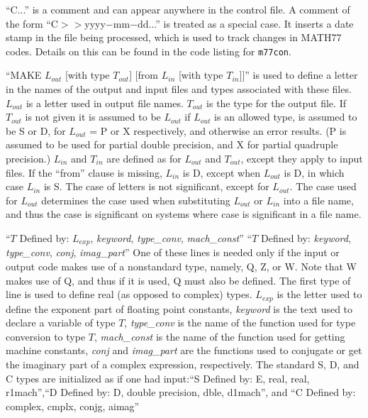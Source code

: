 \documentclass[twoside]{MATH77}
\begin{document}
``C...'' is a comment and can appear anywhere in the control file.  A
comment of the form ``C$>>$yyyy$-$mm$-$dd...'' is treated as a special
case.  It inserts a date stamp in the file being processed, which is
used to track changes in MATH77 codes. Details on this can be found in
the code listing for {\tt m77con}.

``MAKE $L_{out}$ [with type $T_{out}$] [from $L_{in}$ [with type
$T_{in}$]]'' is used to define a letter in the names of the output
and input files and types associated with these files.  $L_{out}$ is
a letter used in output file names.  $T_{out}$ is the type for the
output file. If $T_{out}$ is not given it is assumed to be $L_{out}$
if $L_{out}$ is an allowed type, is assumed to be S or D, for
$L_{out}$ =  P or X respectively, and otherwise an error results.  (P
is assumed to be used for partial double precision, and X for partial
quadruple precision.)  $L_{in}$ and $T_{in}$ are defined as for
$L_{out}$ and $T_{out}$, except they apply to input files.  If the
``from'' clause is missing, $L_{in}$ is D, except when $L_{out}$ is
D, in which case $L_{in}$ is S. The case of letters is not
significant, except for $L_{out}$.  The case used for $L_{out}$
determines the case used when substituting $L_{out}$ or $L_{in}$ into
a file name, and thus the case is significant on systems where case
is significant in a file name.

``$T$ Defined by: $L_{exp}$, {\em keyword}, {\em type\_conv}, {\em
mach\_const}\/''\newline
``$T$ Defined by: {\em keyword}, {\em type\_conv},
{\em conj}, {\em imag\_part}\/''\newline
One of these lines is needed only if the input or output code makes
use of a nonstandard type, namely, Q, Z, or W.  Note that W makes use
of Q, and thus if it is used, Q must also be defined.  The first type
of line is used to define real (as opposed to complex) types.  $L_{exp}$
is the letter used to define the exponent part of floating point
constants, {\em keyword} is the text used to declare a variable of
type $T$, {\em type\_conv} is the name of the function used for type
conversion to type $T$, {\em mach\_const} is the name of the function
used for getting machine constants, {\em conj} and {\em imag\_part}
are the functions used to conjugate or get the imaginary part of a
complex expression, respectively.  The standard S, D, and C types are
initialized as if one had input:\newline ``S Defined by: E, real,
real, r1mach'',\newline ``D Defined by: D, double precision, dble,
d1mach'', and \newline ``C Defined by: complex, cmplx, conjg, aimag''
\end{document}
